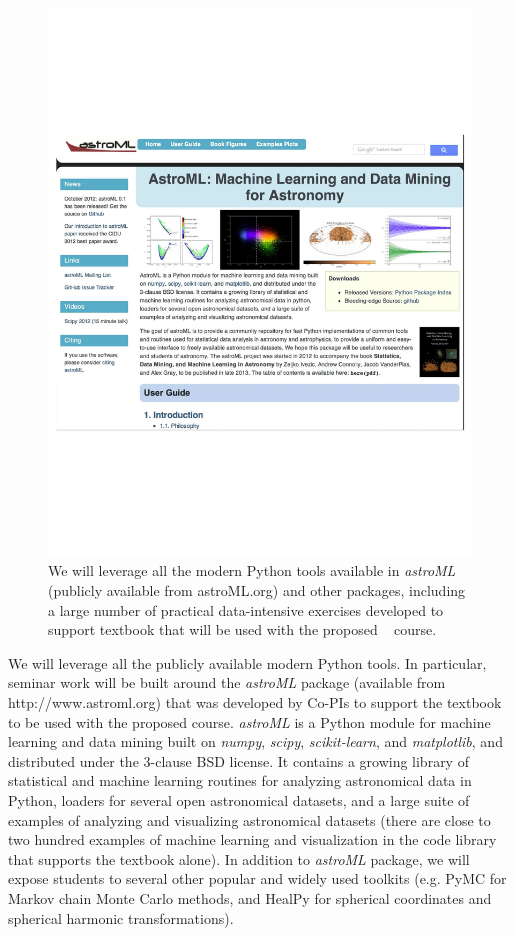 \begin{figure}[!t]
\vskip -1.8in
\includegraphics[width=1.02\hsize,clip]{astroML.pdf}
\vskip -2.0in
\caption{We will leverage all the modern Python tools available in {\it astroML} (publicly
available from astroML.org) and
other packages, including a large number of practical data-intensive exercises developed to
support textbook that will be used with the proposed \astrocl~ course.} 
\label{Fig:astroML}
\end{figure}


We will leverage all the publicly available modern Python tools. In particular, seminar work will be 
built around the {\it astroML} package (available from http://www.astroml.org) that was developed 
by Co-PIs to support the textbook to be used with the proposed \astrocl course. {\it astroML} is a Python module 
for machine learning and data mining built on {\it numpy}, {\it scipy}, {\it scikit-learn}, and {\it matplotlib}, 
and distributed under the 3-clause BSD license. It contains a growing library of statistical and machine 
learning routines for analyzing astronomical data in Python, loaders for several open astronomical datasets, 
and a large suite of examples of analyzing and visualizing astronomical datasets (there are close to two 
hundred examples of machine learning and visualization in the code library that supports the textbook 
alone). In addition to  {\it astroML} package, we will expose students to several other popular and widely
used toolkits (e.g. PyMC for Markov chain Monte Carlo methods, and HealPy for spherical coordinates 
and spherical harmonic transformations). 

